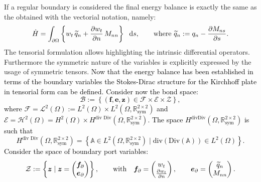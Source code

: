 \documentclass[11pt]{article}
\newcommand{\revOne}[1]{\textcolor{black}{#1}}
\begin{document}
	If a regular boundary is considered the final energy balance is exactly the same as the obtained with the vectorial notation, namely:
	\begin{equation}
	\dot{H} = \int_{\partial \Omega} \left\{ w_t \, \widetilde{q}_n + \diffp{w_t}{n} \, M_{nn}\right\} \ \d{s},  \qquad \text{where }\widetilde{q}_n := q_n - \diffp{M_{ns}}{s}.
	\end{equation} 
	The tensorial formulation allows highlighting the intrinsic differential operators. Furthermore the symmetric nature of the variables is explicitly expressed by the usage of symmetric tensors. \revOne{Now that the energy balance has been established in terms of the boundary variables the Stokes-Dirac structure for the Kirchhoff plate in tensorial form can be defined. Consider now the bond space:
		\begin{equation}
		\label{eq:bondKir}
		\mathcal{B} := \left\{(\bm{f}, \bm{e}, \bm{z}) \in \mathcal{F} \times \mathcal{E} \times \mathcal{Z} \right\},
		\end{equation}
		where $\mathcal{F}=  \mathscr{L}^2(\Omega) :=  L^2(\Omega) \times L^2(\Omega, \mathbb{R}^{2 \times 2}_{\text{sym}})$ and $ \mathcal{E} =  \mathscr{H}^2(\Omega) = H^{2}(\Omega) \times H^{\text{div Div}}(\Omega, \mathbb{R}^{2 \times 2}_{\text{sym}})$. The space $H^{\text{divDiv}}(\Omega, \mathbb{R}^{2 \times 2}_{\text{sym}})$ is such that
		\[
		H^{\text{div Div}}(\Omega, \mathbb{R}^{2 \times 2}_{\text{sym}}) = \left\{ \mathbb{A} \in L^2(\Omega, \mathbb{R}^{2 \times 2}_{\text{sym}}) \; \vert \; \mathrm{div}(\mathrm{Div}(\mathbb{A})) \in L^2(\Omega) \right\}.
		\] Consider the space of boundary port variables:
		\begin{equation}
		\begin{gathered}
		\mathcal{Z} := \left\{ \bm{z} \; \vert \; \bm{z} = \begin{pmatrix} \bm{f}_{\partial} \\ \bm{e}_{\partial} \end{pmatrix} \right\}, \qquad \text{with} \quad
		\bm{f}_\partial = 
		\begin{pmatrix}
		w_t \\ \diffp{w_t}{n} \\
		\end{pmatrix}, \qquad
		\bm{e}_\partial = 
		\begin{pmatrix}
		\widetilde{q}_n \\ M_{nn} \\
		\end{pmatrix}.
		\end{gathered}

\end{equation}}
\end{document}
